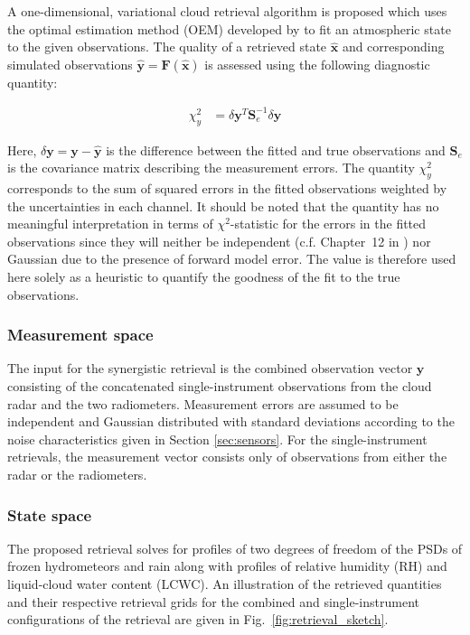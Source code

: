 \documentclass[journal abbreviation, manuscript]{copernicus}
\begin{document}
A one-dimensional, variational cloud retrieval algorithm is proposed which uses
the optimal estimation method (OEM) developed by \cite{rodgers00} to fit an
atmospheric state to the given observations. The quality of a
retrieved state $\hat{\mathbf{x}}$ and corresponding simulated observations
$\hat{\mathbf{y}} = \mathbf{F}(\hat{\mathbf{x}})$ is assessed using the
following diagnostic quantity:

\begin{align}
\chi^2_y &= \delta \mathbf{y}^T \mathbf{S}_e^{-1} \delta \mathbf{y}
\end{align}

Here, $\delta \mathbf{y} = \mathbf{y} - \hat{\mathbf{y}}$ is the difference
between the fitted and true observations and $\mathbf{S}_e$ is the covariance
matrix describing the measurement errors. The quantity $\chi^2_y$ corresponds to
the sum of squared errors in the fitted observations weighted by the
uncertainties in each channel. It should be noted that the quantity has no
meaningful interpretation in terms of $\chi^2$-statistic for the errors in the
fitted observations since they will neither be independent (c.f. Chapter~12 in
\cite{rodgers00}) nor Gaussian due to the presence of forward model error. The
value is therefore used here solely as a heuristic to quantify the goodness of
the fit to the true observations.

\subsubsection{Measurement space}
\label{sec:orge7dc286}

The input for the synergistic retrieval is the combined observation vector
$\mathbf{y}$ consisting of the concatenated single-instrument observations from
the cloud radar and the two radiometers. Measurement errors are assumed to be
independent and Gaussian distributed with standard deviations according to the
noise characteristics given in Section \ref{sec:sensors}. For the
single-instrument retrievals, the measurement vector consists only of
 observations from either the radar or the radiometers.


\subsubsection{State space}
\label{sec:method:state_space}

The proposed retrieval solves for profiles of two degrees of freedom of the PSDs
of frozen hydrometeors and rain along with profiles of relative humidity (RH)
and liquid-cloud water content (LCWC). An illustration of the retrieved
quantities and their respective retrieval grids for the combined and
single-instrument configurations of the retrieval are given in
Fig.~\ref{fig:retrieval_sketch}.
\end{document}
